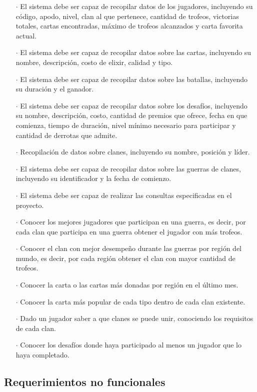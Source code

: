 \begin{enumerate}
  \item[\(\cdot\)] El sistema debe ser capaz de recopilar datos de los jugadores, incluyendo su código, apodo, nivel, clan al que pertenece, cantidad de trofeos, victorias totales, cartas encontradas, máximo de trofeos alcanzados y carta favorita actual.
  \item[\(\cdot\)] El sistema debe ser capaz de recopilar datos sobre las cartas, incluyendo su nombre, descripción, costo de elixir, calidad y tipo.
  \item[\(\cdot\)] El sistema debe ser capaz de recopilar datos sobre las batallas, incluyendo su duración y el ganador.
  \item[\(\cdot\)] El sistema debe ser capaz de recopilar datos sobre los desafíos, incluyendo su nombre, descripción, costo, cantidad de premios que ofrece, fecha en que comienza, tiempo de duración, nivel mínimo necesario para participar y cantidad de derrotas que admite.
  \item[\(\cdot\)] Recopilación de datos sobre clanes, incluyendo su nombre, posición y líder.
  \item[\(\cdot\)] El sistema debe ser capaz de recopilar datos sobre las guerras de clanes, incluyendo su identificador y la fecha de comienzo.
  \item[\(\cdot\)] El sistema debe ser capaz de realizar las consultas especificadas en el proyecto. 
  \item[\(\cdot\)] Conocer los mejores jugadores que participan en una guerra, es decir, por cada clan que participa en una guerra obtener el jugador con más trofeos.
  \item[\(\cdot\)] Conocer el clan con mejor desempeño durante las guerras por región del mundo, es decir, por cada región obtener el clan con mayor cantidad de trofeos.
  \item[\(\cdot\)] Conocer la carta o las cartas más donadas por región en el último mes.
  \item[\(\cdot\)] Conocer la carta más popular de cada tipo dentro de cada clan existente.
  \item[\(\cdot\)] Dado un jugador saber a que clanes se puede unir, conociendo los requisitos de cada clan.
  \item[\(\cdot\)] Conocer los desafíos donde haya participado al menos un jugador que lo haya completado.
\end{enumerate}

\subsection{Requerimientos no funcionales}

